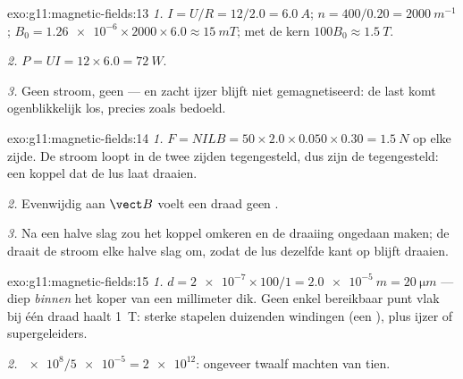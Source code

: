 \begin{solution}{exo:g11:magnetic-fields:13}
\emph{1.} $I = U/R = 12/2.0 = \qty{6.0}{A}$;
$n = 400/0.20 = \qty{2000}{m^{-1}}$;
$B_0 = \num{1.26e-6} \times 2000 \times 6.0 \approx \qty{15}{mT}$; met de
kern $100 B_0 \approx \qty{1.5}{T}$.

\emph{2.} $P = UI = 12 \times 6.0 = \qty{72}{W}$.

\emph{3.} Geen stroom, geen  --- en zacht ijzer blijft niet
gemagnetiseerd: de last komt ogenblikkelijk los, precies zoals bedoeld.
\end{solution}

\begin{solution}{exo:g11:magnetic-fields:14}
\emph{1.} $F = NILB = 50 \times 2.0 \times 0.050 \times 0.30 =
\qty{1.5}{N}$ op elke zijde. De stroom loopt in de twee zijden
tegengesteld, dus zijn de  tegengesteld: een koppel dat de lus
laat draaien.

\emph{2.} Evenwijdig aan $\vect B$ voelt een draad geen .

\emph{3.} Na een halve slag zou het koppel omkeren en de draaiing
ongedaan maken; de  draait de stroom elke halve slag om, zodat
de lus dezelfde kant op blijft draaien.
\end{solution}

\begin{solution}{exo:g11:magnetic-fields:15}
\emph{1.} $d = \num{2e-7} \times 100 / 1 = \qty{2.0e-5}{m} =
\qty{20}{\micro m}$ --- diep \emph{binnen} het koper van een millimeter
dik. Geen enkel bereikbaar punt vlak bij één draad haalt \qty{1}{T}:
sterke  stapelen duizenden windingen (een ), plus ijzer of
supergeleiders.

\emph{2.} $\num{e8} / \num{5e-5} = \num{2e12}$: ongeveer twaalf machten
van tien.
\end{solution}

